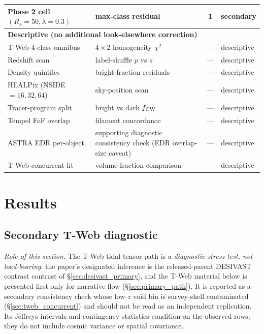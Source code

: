 \documentclass[aps,prd,twocolumn,superscriptaddress,showpacs,preprintnumbers,nofootinbib,longbibliography,floatfix]{revtex4-2}
\begin{document}
\begin{table}[ht]
\begin{ruledtabular}
\begin{tabular}{llcl}
Phase 2 cell $(R_s=50,\lambda=0.3)$ & max-class residual & 1 & secondary \\
\hline
\multicolumn{4}{l}{\textbf{Descriptive (no additional look-elsewhere correction)}} \\
T-Web 4-class omnibus & $4\!\times\!2$ homogeneity $\chi^2$ & --- & descriptive \\
Redshift scan & label-shuffle $p$ vs $z$ & --- & descriptive \\
Density quintiles & bright-fraction residuals & --- & descriptive \\
HEALPix (NSIDE $=16,32,64$) & sky-position scan & --- & descriptive \\
Tracer-program split & bright vs dark $f_{\rm CW}$ & --- & descriptive \\
Tempel FoF overlap & filament concordance & --- & descriptive \\
ASTRA EDR per-object & supporting diagnostic consistency check (EDR overlap-size caveat) & --- & descriptive \\
T-Web concurrent-lit & volume-fraction comparison & --- & descriptive \\
\end{tabular}
\end{ruledtabular}
\end{table}

\section{Results}\label{sec:results}

\subsection{Secondary T-Web diagnostic}\label{sec:results_vweb}

\emph{Role of this section.} The T-Web tidal-tensor path is a
\emph{diagnostic stress test, not load-bearing}: the paper's designated
inference is the released-parent DESIVAST contrast
contrast of \S\ref{sec:desivast_primary}, and the T-Web material below is
presented first only for narrative flow (\S\ref{sec:primary_path}).
It is reported as a secondary consistency check whose
low-$z$ void bin is survey-shell contaminated (\S\ref{sec:tweb_concurrent})
and should not be read as an independent replication. Its Jeffreys
intervals and contingency statistics condition on the observed rows;
they do not include cosmic variance or spatial covariance.
\end{document}
